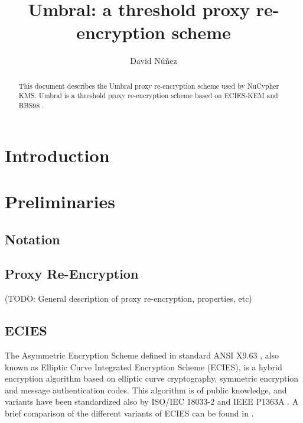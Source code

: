 \documentclass[12pt]{article}
\title{Umbral: a threshold proxy re-encryption scheme}
\author{David Núñez}
\date{} %
\begin{document}
\maketitle

\begin{abstract}
This document describes the Umbral proxy re-encryption scheme used by NuCypher KMS. 
Umbral is a threshold proxy re-encryption scheme based on ECIES-KEM \cite{ansi-x9.63} and BBS98 \cite{blaze1998divertible}. 


\end{abstract}



\section{Introduction}

\section{Preliminaries}

\subsection{Notation}

\subsection{Proxy Re-Encryption}

(TODO: General description of proxy re-encryption, properties, etc)

\subsection{ECIES}

The Asymmetric Encryption Scheme defined in standard ANSI X9.63 \cite{ansi-x9.63}, also known as Elliptic Curve Integrated Encryption Scheme (ECIES), is a hybrid encryption algorithm based on elliptic curve cryptography, symmetric encryption and message authentication codes. 
This algorithm is of public knowledge, and variants have been standardized also by ISO/IEC 18033-2 \cite{iso-18033-2} and IEEE P1363A \cite{ieee-p1363a}. A brief comparison of the different variants of ECIES can be found in \cite{martinez2010comparison}. 
\end{document}
